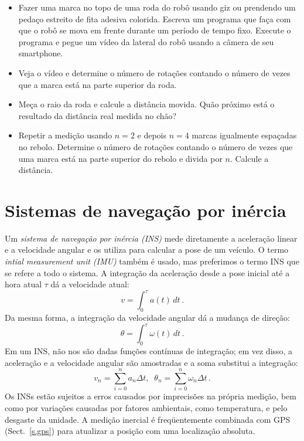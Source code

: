 {\begin{framed}
\begin{itemize}
\item Fazer uma marca no topo de uma roda do robô usando giz ou prendendo um pedaço estreito de fita adesiva colorida. Escreva um programa que faça com que o robô se mova em frente durante um período de tempo fixo. Execute o programa e pegue um vídeo da lateral do robô usando a câmera de seu smartphone.
\item Veja o vídeo e determine o número de rotações contando o número de vezes que a marca está na parte superior da roda.
\item Meça o raio da roda e calcule a distância movida. Quão próximo está o resultado da distância real medida no chão?
\item Repetir a medição usando $n=2$ e depois $n=4$ marcas igualmente espaçadas no rebolo. Determine o número de rotações contando o número de vezes que uma marca está na parte superior do rebolo e divida por $n$. Calcule a distância.
\end{itemize}
\end{framed}

\section{Sistemas de navegação por inércia}\label{s.imu}

Um \emph{sistema de navegação por inércia (INS)} mede diretamente a aceleração linear e a velocidade angular e os utiliza para calcular a pose de um veículo. O termo \emph{intial measurement unit (IMU)} também é usado, mas preferimos o termo INS que se refere a todo o sistema. A integração da aceleração desde a pose inicial até a hora atual $\tau$ dá a velocidade atual:
\[
v=\int_0^\tau a(t) \,dt\,.
\]
Da mesma forma, a integração da velocidade angular dá a mudança de direção:
\[
\theta = \int_0^\tau \omega(t) \, dt\,.
\]
Em um INS, não nos são dadas funções contínuas de integração; em vez disso, a aceleração e a velocidade angular são amostradas e a soma substitui a integração:
\[
v_n = \sum^{n}_{i=0} a_n \Delta t,\;\; \theta_n = \sum^{n}_{i=0} \omega_n \Delta t\,.
\]
Os INSs estão sujeitos a erros causados por imprecisões na própria medição, bem como por variações causadas por fatores ambientais, como temperatura, e pelo desgaste da unidade. A medição inercial é freqüentemente combinada com GPS (Sect.~\ref{s.gps}) para atualizar a posição com uma localização absoluta.

}
